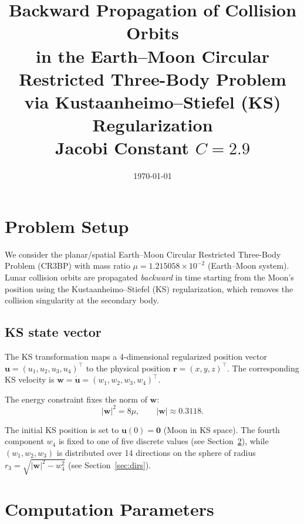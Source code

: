 \documentclass[a4paper,11pt]{article}
\title{\textbf{Backward Propagation of Collision Orbits}\\[0.3em]
  in the Earth--Moon Circular Restricted Three-Body Problem\\
  via Kustaanheimo--Stiefel (KS) Regularization\\[0.8em]
  \large Jacobi Constant $C = 2.9$}
\author{}
\date{\today}
\begin{document}
\maketitle
\tableofcontents
\clearpage

\section{Problem Setup}

We consider the planar/spatial Earth--Moon Circular Restricted
Three-Body Problem (CR3BP) with mass ratio
$\mu = 1.215058 \times 10^{-2}$ (Earth--Moon system).
Lunar collision orbits are propagated \emph{backward} in time
starting from the Moon's position using the
Kustaanheimo--Stiefel (KS) regularization, which removes
the collision singularity at the secondary body.

\subsection*{KS state vector}

The KS transformation maps a 4-dimensional regularized position
vector $\boldsymbol{u} = (u_1, u_2, u_3, u_4)^{\top}$ to
the physical position $\boldsymbol{r} = (x, y, z)^{\top}$.
The corresponding KS velocity is
$\boldsymbol{w} = \dot{\boldsymbol{u}} = (w_1, w_2, w_3, w_4)^{\top}$.

The energy constraint fixes the norm of $\boldsymbol{w}$:
\[
  |\boldsymbol{w}|^2 = 8\mu, \qquad
  |\boldsymbol{w}| \approx 0.3118.
\]

The initial KS position is set to $\boldsymbol{u}(0) = \boldsymbol{0}$
(Moon in KS space).  The fourth component $w_4$ is fixed to one of five
discrete values (see Section~\ref{sec:params}), while
$(w_1, w_2, w_3)$ is distributed over 14 directions on the sphere
of radius $r_3 = \sqrt{|\boldsymbol{w}|^2 - w_4^2}$
(see Section~\ref{sec:dirs}).

\section{Computation Parameters}
\label{sec:params}
\end{document}
